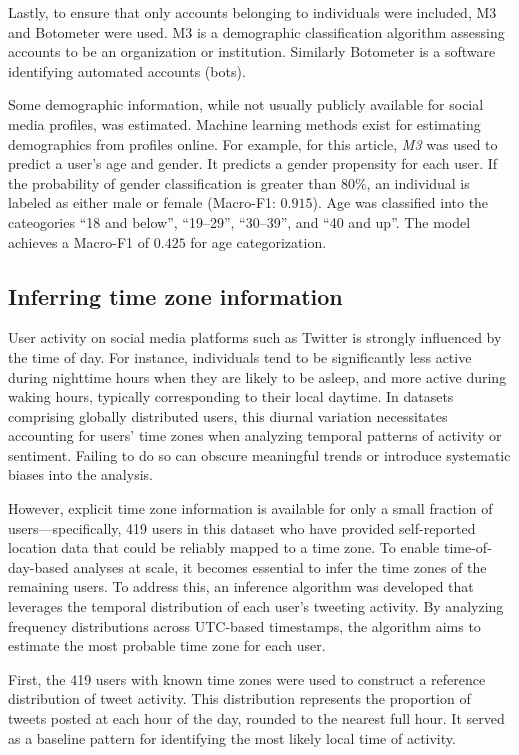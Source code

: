 Lastly, to ensure that only accounts belonging to individuals were included, M3 and Botometer were used. M3 is a demographic classification algorithm assessing accounts to be an organization or institution. Similarly Botometer is a software identifying automated accounts (bots).

Some demographic information, while not usually publicly available for social media profiles, was estimated. Machine learning methods exist for estimating demographics from profiles online. For example, for this article, \textit{M3} \citep{m3} was used to predict a user's age and gender. It predicts a gender propensity for each user. If the probability of gender classification is greater than $80\%$, an individual is labeled as either male or female (Macro-F1: $0.915$). Age was classified into the cateogories “18 and below”, “19–29”, “30–39”, and “40 and up”. The model achieves a Macro-F1 of $0.425$ for age categorization.

\subsection{Inferring time zone information}

User activity on social media platforms such as Twitter is strongly influenced by the time of day. For instance, individuals tend to be significantly less active during nighttime hours when they are likely to be asleep, and more active during waking hours, typically corresponding to their local daytime. In datasets comprising globally distributed users, this diurnal variation necessitates accounting for users' time zones when analyzing temporal patterns of activity or sentiment. Failing to do so can obscure meaningful trends or introduce systematic biases into the analysis.

However, explicit time zone information is available for only a small fraction of users—specifically, 419 users in this dataset who have provided self-reported location data that could be reliably mapped to a time zone. To enable time-of-day-based analyses at scale, it becomes essential to infer the time zones of the remaining users. To address this, an inference algorithm was developed that leverages the temporal distribution of each user’s tweeting activity. By analyzing frequency distributions across UTC-based timestamps, the algorithm aims to estimate the most probable time zone for each user.

First, the 419 users with known time zones were used to construct a reference distribution of tweet activity. This distribution represents the proportion of tweets posted at each hour of the day, rounded to the nearest full hour. It served as a baseline pattern for identifying the most likely local time of activity.

